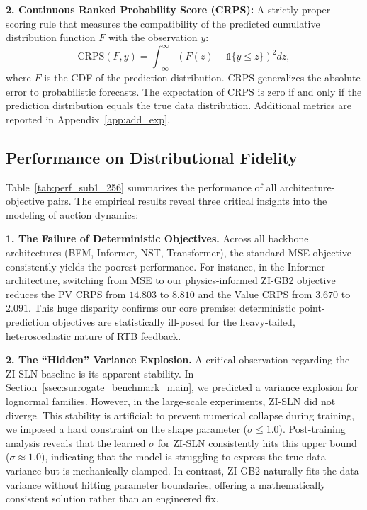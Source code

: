 \documentclass[sigconf, anonymous, review]{acmart}
\begin{document}
\textbf{2. Continuous Ranked Probability Score (CRPS):}
A strictly proper scoring rule that measures the compatibility of the predicted cumulative distribution function $F$ with the observation $y$:
\begin{equation}
    \text{CRPS}(F, y) = \int_{-\infty}^{\infty} (F(z) - \mathbb{1}\{y \le z\})^2 dz,
\end{equation}
where $F$ is the CDF of the prediction distribution.
CRPS generalizes the absolute error to probabilistic forecasts. The expectation of CRPS is zero if and only if the prediction distribution equals the true data distribution.
Additional metrics are reported in Appendix~\ref{app:add_exp}.
\subsection{Performance on Distributional Fidelity}

Table~\ref{tab:perf_sub1_256} summarizes the performance of all architecture-objective pairs. The empirical results reveal three critical insights into the modeling of auction dynamics:

\textbf{1. The Failure of Deterministic Objectives.}
Across all backbone architectures (BFM, Informer, NST, Transformer), the standard MSE objective consistently yields the poorest performance.
For instance, in the Informer architecture, switching from MSE to our physics-informed ZI-GB2 objective reduces the PV CRPS from $14.803$ to $8.810$ and the Value CRPS from $3.670$ to $2.091$.
This huge disparity confirms our core premise: deterministic point-prediction objectives are statistically ill-posed for the heavy-tailed, heteroscedastic nature of RTB feedback.

\textbf{2. The ``Hidden'' Variance Explosion.}
A critical observation regarding the ZI-SLN baseline is its apparent stability.
In Section~\ref{ssec:surrogate_benchmark_main}, we predicted a variance explosion for lognormal families.
However, in the large-scale experiments, ZI-SLN did not diverge.
This stability is artificial: to prevent numerical collapse during training, we imposed a hard constraint on the shape parameter ($\sigma \le 1.0$).
Post-training analysis reveals that the learned $\sigma$ for ZI-SLN consistently hits this upper bound ($\sigma \approx 1.0$), indicating that the model is struggling to express the true data variance but is mechanically clamped.
In contrast, ZI-GB2 naturally fits the data variance without hitting parameter boundaries, offering a mathematically consistent solution rather than an engineered fix.
\end{document}
